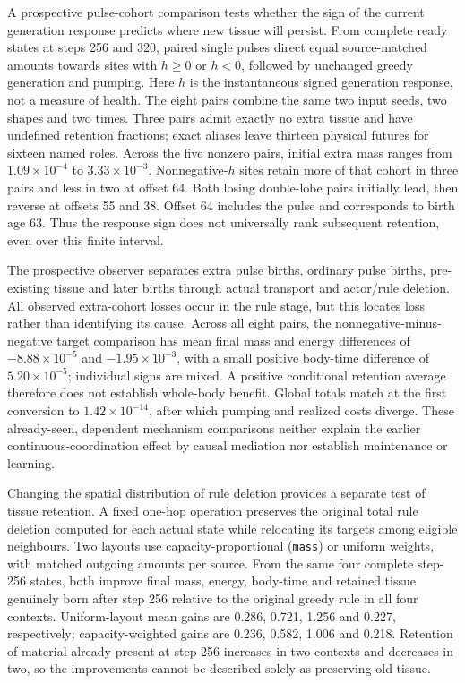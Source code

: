 A prospective pulse-cohort comparison tests whether the sign of the current generation response predicts where new tissue will persist. From complete ready states at steps 256 and 320, paired single pulses direct equal source-matched amounts towards sites with $h\geq0$ or $h<0$, followed by unchanged greedy generation and pumping. Here $h$ is the instantaneous signed generation response, not a measure of health. The eight pairs combine the same two input seeds, two shapes and two times. Three pairs admit exactly no extra tissue and have undefined retention fractions; exact aliases leave thirteen physical futures for sixteen named roles. Across the five nonzero pairs, initial extra mass ranges from $1.09\times10^{-4}$ to $3.33\times10^{-3}$. Nonnegative-$h$ sites retain more of that cohort in three pairs and less in two at offset 64. Both losing double-lobe pairs initially lead, then reverse at offsets 55 and 38. Offset 64 includes the pulse and corresponds to birth age 63. Thus the response sign does not universally rank subsequent retention, even over this finite interval.

The prospective observer separates extra pulse births, ordinary pulse births, pre-existing tissue and later births through actual transport and actor/rule deletion. All observed extra-cohort losses occur in the rule stage, but this locates loss rather than identifying its cause. Across all eight pairs, the nonnegative-minus-negative target comparison has mean final mass and energy differences of $-8.88\times10^{-5}$ and $-1.95\times10^{-3}$, with a small positive body-time difference of $5.20\times10^{-5}$; individual signs are mixed. A positive conditional retention average therefore does not establish whole-body benefit. Global totals match at the first conversion to $1.42\times10^{-14}$, after which pumping and realized costs diverge. These already-seen, dependent mechanism comparisons neither explain the earlier continuous-coordination effect by causal mediation nor establish maintenance or learning.

\begingroup{}
Changing the spatial distribution of rule deletion provides a separate test of tissue retention. A fixed one-hop operation preserves the original total rule deletion computed for each actual state while relocating its targets among eligible neighbours. Two layouts use capacity-proportional (\texttt{mass}) or uniform weights, with matched outgoing amounts per source. From the same four complete step-256 states, both improve final mass, energy, body-time and retained tissue genuinely born after step 256 relative to the original greedy rule in all four contexts. Uniform-layout mean gains are 0.286, 0.721, 1.256 and 0.227, respectively; capacity-weighted gains are 0.236, 0.582, 1.006 and 0.218. Retention of material already present at step 256 increases in two contexts and decreases in two, so the improvements cannot be described solely as preserving old tissue.\par\endgroup

